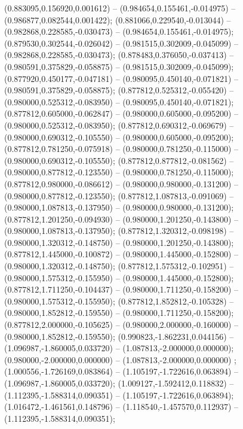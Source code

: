  (0.883095,0.156920,0.001612) -- (0.984654,0.155461,-0.014975) -- (0.986877,0.082544,0.001422);
 (0.881066,0.229540,-0.013044) -- (0.982868,0.228585,-0.030473) -- (0.984654,0.155461,-0.014975);
 (0.879530,0.302544,-0.026042) -- (0.981515,0.302009,-0.045099) -- (0.982868,0.228585,-0.030473);
 (0.878483,0.376050,-0.037413) -- (0.980591,0.375829,-0.058875) -- (0.981515,0.302009,-0.045099);
 (0.877920,0.450177,-0.047181) -- (0.980095,0.450140,-0.071821) -- (0.980591,0.375829,-0.058875);
 (0.877812,0.525312,-0.055420) -- (0.980000,0.525312,-0.083950) -- (0.980095,0.450140,-0.071821);
 (0.877812,0.605000,-0.062847) -- (0.980000,0.605000,-0.095200) -- (0.980000,0.525312,-0.083950);
 (0.877812,0.690312,-0.069679) -- (0.980000,0.690312,-0.105550) -- (0.980000,0.605000,-0.095200);
 (0.877812,0.781250,-0.075918) -- (0.980000,0.781250,-0.115000) -- (0.980000,0.690312,-0.105550);
 (0.877812,0.877812,-0.081562) -- (0.980000,0.877812,-0.123550) -- (0.980000,0.781250,-0.115000);
 (0.877812,0.980000,-0.086612) -- (0.980000,0.980000,-0.131200) -- (0.980000,0.877812,-0.123550);
 (0.877812,1.087813,-0.091069) -- (0.980000,1.087813,-0.137950) -- (0.980000,0.980000,-0.131200);
 (0.877812,1.201250,-0.094930) -- (0.980000,1.201250,-0.143800) -- (0.980000,1.087813,-0.137950);
 (0.877812,1.320312,-0.098198) -- (0.980000,1.320312,-0.148750) -- (0.980000,1.201250,-0.143800);
 (0.877812,1.445000,-0.100872) -- (0.980000,1.445000,-0.152800) -- (0.980000,1.320312,-0.148750);
 (0.877812,1.575312,-0.102951) -- (0.980000,1.575312,-0.155950) -- (0.980000,1.445000,-0.152800);
 (0.877812,1.711250,-0.104437) -- (0.980000,1.711250,-0.158200) -- (0.980000,1.575312,-0.155950);
 (0.877812,1.852812,-0.105328) -- (0.980000,1.852812,-0.159550) -- (0.980000,1.711250,-0.158200);
 (0.877812,2.000000,-0.105625) -- (0.980000,2.000000,-0.160000) -- (0.980000,1.852812,-0.159550);
 (0.990823,-1.862231,0.044156) -- (1.096987,-1.860005,0.033720) -- (1.087813,-2.000000,0.000000);
 (0.980000,-2.000000,0.000000) -- (1.087813,-2.000000,0.000000) ;
 (1.000556,-1.726169,0.083864) -- (1.105197,-1.722616,0.063894) -- (1.096987,-1.860005,0.033720);
 (1.009127,-1.592412,0.118832) -- (1.112395,-1.588314,0.090351) -- (1.105197,-1.722616,0.063894);
 (1.016472,-1.461561,0.148796) -- (1.118540,-1.457570,0.112937) -- (1.112395,-1.588314,0.090351);

